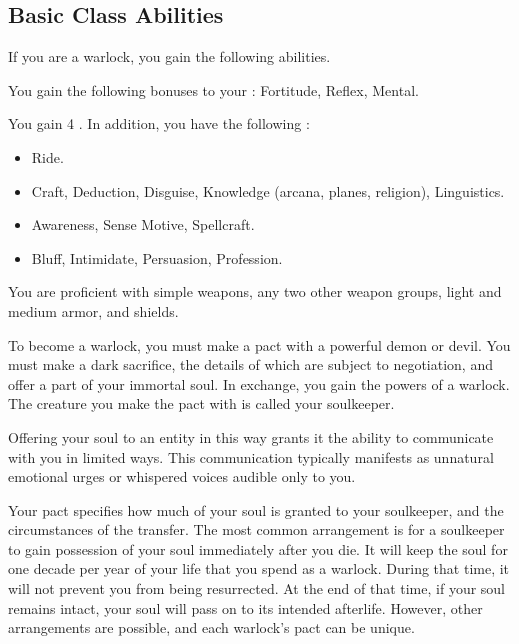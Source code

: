     \subsection{Basic Class Abilities}
        If you are a warlock, you gain the following abilities.

        You gain the following bonuses to your :  Fortitude,  Reflex,  Mental.

        You gain 4 .
        In addition, you have the following :
        \begin{itemize}
            \item {} Ride.
            \item {} Craft, Deduction, Disguise, Knowledge (arcana, planes, religion), Linguistics.
            \item {} Awareness, Sense Motive, Spellcraft.
            \item {} Bluff, Intimidate, Persuasion, Profession.
        \end{itemize}

        You are proficient with simple weapons, any two other weapon groups, light and medium armor, and shields.

        To become a warlock, you must make a pact with a powerful demon or devil.
        You must make a dark sacrifice, the details of which are subject to negotiation, and offer a part of your immortal soul.
        In exchange, you gain the powers of a warlock.
        The creature you make the pact with is called your soulkeeper.

        Offering your soul to an entity in this way grants it the ability to communicate with you in limited ways.
        This communication typically manifests as unnatural emotional urges or whispered voices audible only to you.

        Your pact specifies how much of your soul is granted to your soulkeeper, and the circumstances of the transfer.
        The most common arrangement is for a soulkeeper to gain possession of your soul immediately after you die.
        It will keep the soul for one decade per year of your life that you spend as a warlock.
        During that time, it will not prevent you from being resurrected.
        At the end of that time, if your soul remains intact, your soul will pass on to its intended afterlife.
        However, other arrangements are possible, and each warlock's pact can be unique.


